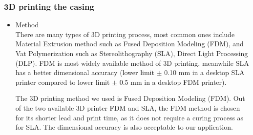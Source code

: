 \subsubsection{3D printing the casing}
\begin{itemize}
    \item Method\\ 
    There are many types of 3D printing process, most common ones include Material Extrusion method such as Fused Deposition Modeling (FDM), and Vat Polymerization such as Stereolithography (SLA), Direct Light Processing (DLP). FDM is most widely available method of 3D printing, meanwhile SLA has a better dimensional accuracy (lower limit $\pm$ 0.10 mm in a desktop SLA printer compared to lower limit $\pm$ 0.5 mm in a desktop FDM printer).

    The 3D printing method we used is Fused Deposition Modeling (FDM). Out of the two available 3D printer FDM and SLA, the FDM method is chosen for its shorter lead and print time, as it does not require a curing process as for SLA. The dimensional accuracy is also acceptable to our application.
    

\end{itemize}
